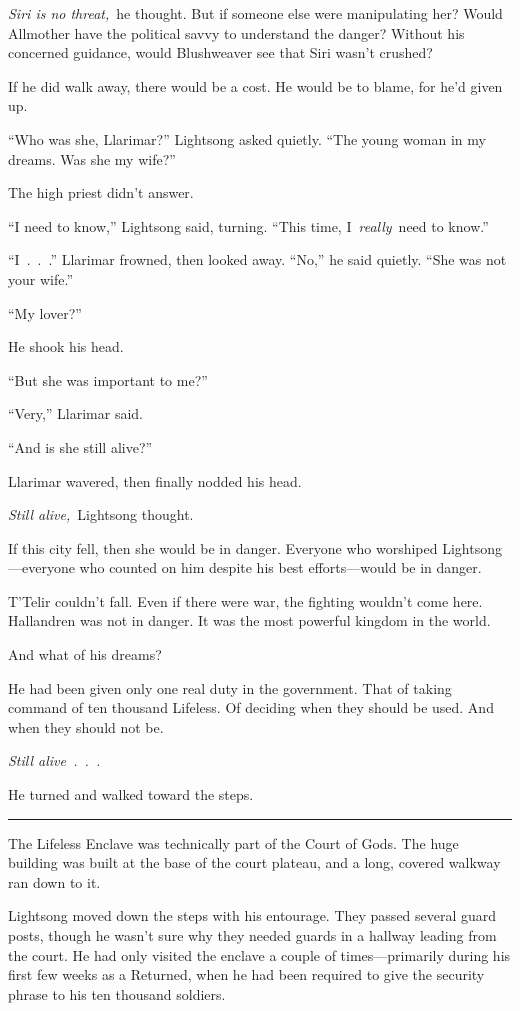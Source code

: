 \textit{Siri is no threat,}~he thought. But if someone else were manipulating her? Would Allmother have the political savvy to understand the danger? Without his concerned guidance, would Blushweaver see that Siri wasn’t crushed?

If he did walk away, there would be a cost. He would be to blame, for he’d given up.

“Who was she, Llarimar?” Lightsong asked quietly. “The young woman in my dreams. Was she my wife?”

The high priest didn’t answer.

“I need to know,” Lightsong said, turning. “This time, I~\textit{really}~need to know.”

“I~.~.~.” Llarimar frowned, then looked away. “No,” he said quietly. “She was not your wife.”

“My lover?”

He shook his head.

“But she was important to me?”

“Very,” Llarimar said.

“And is she still alive?”

Llarimar wavered, then finally nodded his head.

\textit{Still alive,}~Lightsong thought.

If this city fell, then she would be in danger. Everyone who worshiped Lightsong—everyone who counted on him despite his best efforts—would be in danger.

T’Telir couldn’t fall. Even if there were war, the fighting wouldn’t come here. Hallandren was not in danger. It was the most powerful kingdom in the world.

And what of his dreams?

He had been given only one real duty in the government. That of taking command of ten thousand Lifeless. Of deciding when they should be used. And when they should not be.

\textit{Still alive~.~.~.}

He turned and walked toward the steps.

\bigskip \hrule \bigskip

The Lifeless Enclave was technically part of the Court of Gods. The huge building was built at the base of the court plateau, and a long, covered walkway ran down to it.

Lightsong moved down the steps with his entourage. They passed several guard posts, though he wasn’t sure why they needed guards in a hallway leading from the court. He had only visited the enclave a couple of times—primarily during his first few weeks as a Returned, when he had been required to give the security phrase to his ten thousand soldiers.

